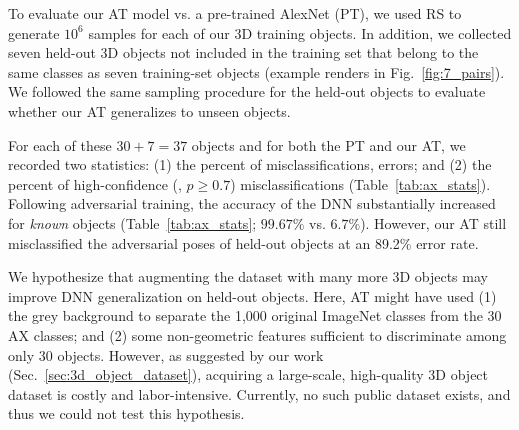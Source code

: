 \documentclass[10pt,twocolumn,letterpaper]{article}
\newcommand{\subsec}[1]{\noindent{\textbf{#1.}}}
\begin{document}
%

\subsec{Evaluation} 
To evaluate our AT model vs. a pre-trained AlexNet (PT), we used RS to generate $10^6$ samples for each of our 3D training objects.
In addition, we collected seven held-out 3D objects not included in the training set that belong to the same classes as seven training-set objects (example renders in Fig.~\ref{fig:7_pairs}).
We followed the same sampling procedure for the held-out objects to evaluate whether our AT generalizes to unseen objects.


For each of these $30 + 7 = 37$ objects and for both the PT and our AT, we recorded two statistics: (1) the percent of misclassifications, \ie errors; and (2) the percent of high-confidence (\ie, $p \geq 0.7$) misclassifications (Table~\ref{tab:ax_stats}).
Following adversarial training, the accuracy of the DNN substantially increased for \emph{known} objects (Table~\ref{tab:ax_stats}; $99.67\%$ vs. $6.7\%$).
However, our AT still misclassified the adversarial poses of held-out objects at an 89.2\% error rate.

We hypothesize that augmenting the dataset with many more 3D objects 
may improve DNN generalization on held-out objects.
Here, AT might have used (1) the grey background to separate the 1,000 original ImageNet classes from the 30 AX classes; and (2) some non-geometric features 
sufficient to discriminate among only 30 objects.
However, as suggested by our work (Sec.~\ref{sec:3d_object_dataset}), acquiring a large-scale, high-quality 3D object dataset is costly and labor-intensive. 
Currently, no such public dataset exists, and thus we could not test this hypothesis.
\end{document}
